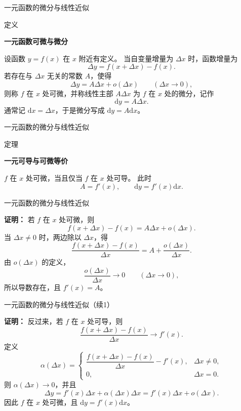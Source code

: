 \documentclass[aspectratio=169,10pt,fontset=fandol]{ctexbeamer}
\newcommand{\dd}{\mathrm{d}}
\begin{document}
\begin{frame}[t,fragile]{一元函数的微分与线性近似}
\normalsize
\begin{block}{定义}
{\normalsize
\textbf{一元函数可微与微分}\par

设函数 $y=f(x)$ 在 $x$ 附近有定义。 当自变量增量为 $\Delta x$ 时，函数增量为
\[
\Delta y=f(x+\Delta x)-f(x).
\]
若存在与 $\Delta x$ 无关的常数 $A$，使得
\[
\Delta y=A\Delta x+o(\Delta x)\qquad(\Delta x\to0),
\]
则称 $f$ 在 $x$ 处可微，并称线性主部 $A\Delta x$ 为 $f$ 在 $x$ 处的微分，记作
\[
\dd y=A\Delta x.
\]
通常记 $\dd x=\Delta x$，于是微分写成 $\dd y=A\dd x$。

}
\end{block}
\end{frame}
\begin{frame}[t,fragile]{一元函数的微分与线性近似}
\footnotesize
\begin{block}{定理}
{\footnotesize
\textbf{一元可导与可微等价}\par

$f$ 在 $x$ 处可微，当且仅当 $f$ 在 $x$ 处可导。 此时
\[
A=f'(x),\qquad \dd y=f'(x)\dd x.
\]

}
\end{block}
\end{frame}
\begin{frame}[t,fragile]{一元函数的微分与线性近似}
\footnotesize
{\footnotesize
\textbf{证明：}
若 $f$ 在 $x$ 处可微，则
\[
f(x+\Delta x)-f(x)=A\Delta x+o(\Delta x).
\]
当 $\Delta x\neq0$ 时，两边除以 $\Delta x$，得
\[
\frac{f(x+\Delta x)-f(x)}{\Delta x}
=A+\frac{o(\Delta x)}{\Delta x}.
\]
由 $o(\Delta x)$ 的定义，
\[
\frac{o(\Delta x)}{\Delta x}\to0\qquad(\Delta x\to0),
\]
所以导数存在，且 $f'(x)=A$。


}
\end{frame}
\begin{frame}[t,fragile]{一元函数的微分与线性近似（续1）}
\footnotesize
{\footnotesize
\textbf{证明：}
反过来，若 $f$ 在 $x$ 处可导，则
\[
\frac{f(x+\Delta x)-f(x)}{\Delta x}\to f'(x).
\]
定义
\[
\alpha(\Delta x)=
\begin{cases}
\dfrac{f(x+\Delta x)-f(x)}{\Delta x}-f'(x),&\Delta x\neq0,\\[0.8em]
0,&\Delta x=0.
\end{cases}
\]
则 $\alpha(\Delta x)\to0$，并且
\[
\Delta y=f'(x)\Delta x+\alpha(\Delta x)\Delta x
=f'(x)\Delta x+o(\Delta x).
\]
因此 $f$ 在 $x$ 处可微，且 $\dd y=f'(x)\dd x$。

}
\end{frame}
\end{document}
